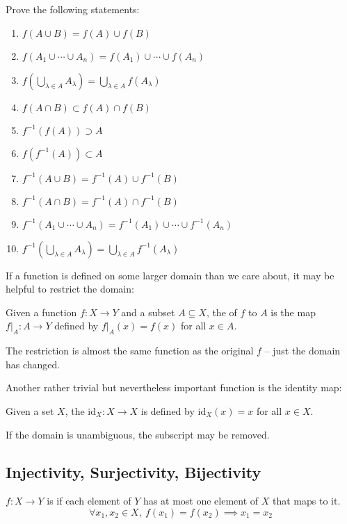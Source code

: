 \begin{exercise}{}{}
Prove the following statements:
\begin{enumerate}[label=(\alph*)]
\item $f(A\cup B)=f(A)\cup f(B)$
\item $f(A_1\cup\cdots\cup A_n)=f(A_1)\cup\cdots\cup f(A_n)$
\item $f(\bigcup_{\lambda\in A}A_\lambda)=\bigcup_{\lambda\in A}f(A_\lambda)$
\item $f(A\cap B)\subset f(A)\cap f(B)$
\item $f^{-1}(f(A))\supset A$
\item $f(f^{-1}(A))\subset A$
\item $f^{-1}(A\cup B)=f^{-1}(A)\cup f^{-1}(B)$
\item $f^{-1}(A\cap B)=f^{-1}(A)\cap f^{-1}(B)$
\item $f^{-1}(A_1\cup\cdots\cup A_n)=f^{-1}(A_1)\cup\cdots\cup f^{-1}(A_n)$
\item $f^{-1}(\bigcup_{\lambda\in A}A_\lambda)=\bigcup_{\lambda\in A}f^{-1}(A_\lambda)$
\end{enumerate}
\end{exercise}

If a function is defined on some larger domain than we care about, it may be helpful to restrict the domain:

\begin{definition}[Restriction]
Given a function $f:X \to Y$ and a subset $A \subseteq X$, the  of $f$ to $A$ is the map $f|_A:A \to Y$ defined by $f|_A(x) = f(x)$ for all $x \in A$.
\end{definition}

The restriction is almost the same function as the original $f$ -- just the domain has changed.

Another rather trivial but nevertheless important function is the identity map:

\begin{definition}
Given a set $X$, the  $\mathrm{id}_X:X \to X$ is defined by $\mathrm{id}_X(x) = x$ for all $x \in X$.
\end{definition}

\begin{notation}
If the domain is unambiguous, the subscript may be removed.
\end{notation}
\pagebreak

\subsection{Injectivity, Surjectivity, Bijectivity}
\begin{definition}
$f:X\to Y$ is  if each element of $Y$ has at most one element of $X$ that maps to it.
\[ \forall x_1,x_2\in X,\:f(x_1)=f(x_2) \implies x_1=x_2 \]
\end{definition}

